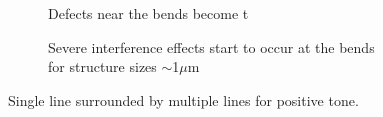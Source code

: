 \begin{figure}[!t]
 \hfill
     \begin{subfigure}[t]{0.24\linewidth}
  	\centering
  	\caption{Defects near the bends become t}
  	\label{fig:b2d15_q15}
   \end{subfigure}
 \hfill
     \begin{subfigure}[t]{0.24\linewidth}
  	\centering
  	\caption{Severe interference effects start to occur at the bends for structure sizes $\sim$1$\mu$m}
  	\label{fig:b2d16_q16}
  \end{subfigure}
\caption{Single line surrounded by multiple lines for positive tone.}
 \end{figure}

